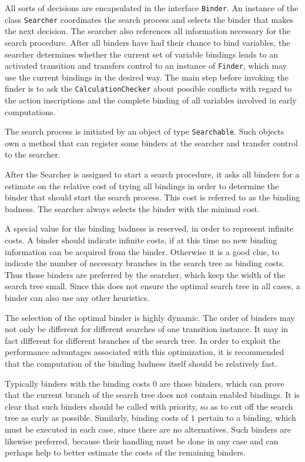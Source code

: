 All sorts of decisions are encapsulated in the interface \texttt{Binder}.
An instance of the class \texttt{Searcher} coordinates the search process
and selects the binder that makes the next decision. The searcher
also references all information necessary for 
the search procedure. After all binders 
have had their chance to bind variables, the searcher determines whether
the current set of variable bindings leads to an activated transition
and transfers control to an instance of \texttt{Finder}, which may
use the current bindings in the desired way. The main step before
invoking the finder is to ask the \texttt{CalculationChecker}
about possible conflicts with regard to the action inscriptions
and the complete binding of all variables involved in early computations.

The search process is initiated by an object of type
\texttt{Searchable}. Such objects own a method that
can register some binders at the searcher and transfer control
to the searcher.

After the Searcher is assigned to start a search procedure, it asks 
all binders for a estimate on the relative cost of trying all
bindings in order to determine the binder that should start the
search process. 
This cost is referred to as the binding badness. The searcher 
always selects the binder with the minimal cost.

A special value for the binding badness is reserved, in 
order to represent infinite costs. A binder should indicate 
infinite costs, if at this time no new binding information 
can be acquired from the binder. 
Otherwise it is a good clue, to indicate the number of 
necessary branches in the search tree as binding costs. 
Thus those binders are preferred by the searcher, which keep 
the width of the search tree small. Since this does not ensure the optimal
search tree in all cases, a binder can also use any other heuristics. 

The selection of the optimal binder is highly dynamic. The order of 
binders may not only
be different for different searches of one transition instance.
It may in fact different for different branches of the search tree.
In order to exploit the performance advantages associated with
this optimization, it is recommended that the computation
of the binding badness itself should be relatively fast.

Typically binders with the binding costs $0$ are those binders, 
which can prove that the current branch of the search tree does 
not contain enabled bindings. It is clear that such binders 
should be called with priority, so as to cut off the search tree as early
as possible. Similarly, binding costs of $1$ pertain to a binding, 
which must be executed in each case, since there are no alternatives. 
Such binders are likewise preferred, because 
their handling must be done in any case and can perhaps help to 
better estimate the costs of the remaining binders. 

